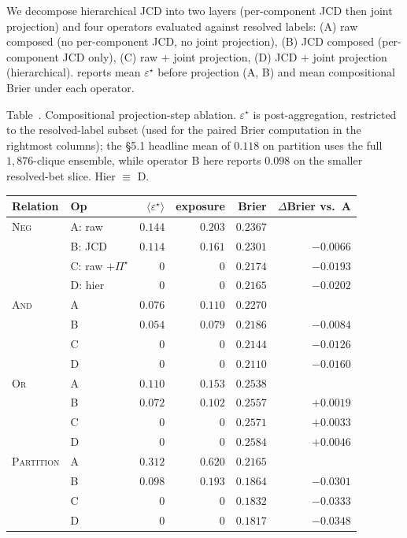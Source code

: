 \documentclass{article}
\theoremstyle{plain}
\theoremstyle{definition}
\theoremstyle{remark}
\newcommand{\eps}{\varepsilon}
\begin{document}
We decompose hierarchical JCD into two layers (per-component JCD
then joint projection) and four operators evaluated against
resolved labels:
(A) raw composed (no per-component JCD, no joint projection),
(B) JCD composed (per-component JCD only),
(C) raw $+$ joint projection,
(D) JCD $+$ joint projection (hierarchical).
 reports mean $\eps^\star$ before projection
(A, B) and mean compositional Brier under each operator.

\begin{center}
\label{tab:proj_ablation}
{\small Table~\thetable. Compositional projection-step ablation. $\eps^\star$ is post-aggregation, restricted to the resolved-label subset (used for the paired Brier computation in the rightmost columns); the §5.1 headline mean of $0.118$ on partition uses the full $1{,}876$-clique ensemble, while operator B here reports $0.098$ on the smaller resolved-bet slice. Hier $\equiv$ D.\par}
\small
\begin{tabular}{llrrrr}
\toprule
Relation & Op & $\langle\eps^\star\rangle$ & exposure & Brier & $\Delta$Brier vs.\ A \\
\midrule
\textsc{Neg} & A: raw            & $0.144$ & $0.203$ & $0.2367$ & \\
             & B: JCD            & $0.114$ & $0.161$ & $0.2301$ & $-0.0066$ \\
             & C: raw $+\Pi^\star$ & $0$     & $0$     & $0.2174$ & $-0.0193$ \\
             & D: hier            & $0$     & $0$     & $0.2165$ & $-0.0202$ \\
\midrule
\textsc{And} & A & $0.076$ & $0.110$ & $0.2270$ & \\
             & B & $0.054$ & $0.079$ & $0.2186$ & $-0.0084$ \\
             & C & $0$     & $0$     & $0.2144$ & $-0.0126$ \\
             & D & $0$     & $0$     & $0.2110$ & $-0.0160$ \\
\midrule
\textsc{Or}  & A & $0.110$ & $0.153$ & $0.2538$ & \\
             & B & $0.072$ & $0.102$ & $0.2557$ & $+0.0019$ \\
             & C & $0$     & $0$     & $0.2571$ & $+0.0033$ \\
             & D & $0$     & $0$     & $0.2584$ & $+0.0046$ \\
\midrule
\textsc{Partition} & A & $0.312$ & $0.620$ & $0.2165$ & \\
                   & B & $0.098$ & $0.193$ & $0.1864$ & $-0.0301$ \\
                   & C & $0$     & $0$     & $0.1832$ & $-0.0333$ \\
                   & D & $0$     & $0$     & $0.1817$ & $-0.0348$ \\
\bottomrule
\end{tabular}
\end{center}
\end{document}

